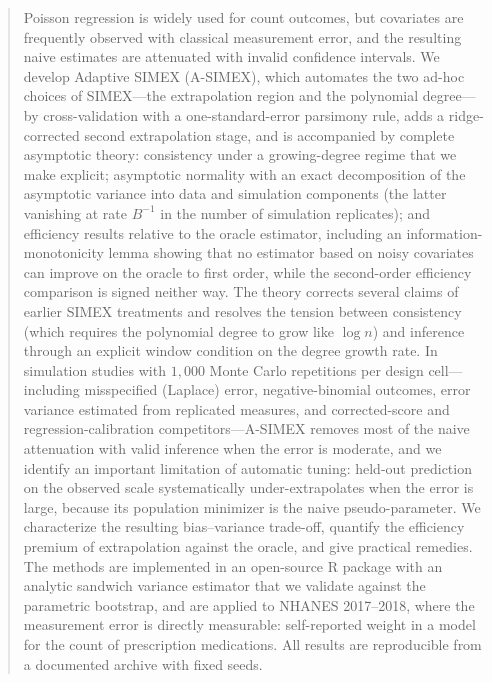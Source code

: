 \begin{abstract}
Poisson regression is widely used for count outcomes, but covariates are
frequently observed with classical measurement error, and the resulting
naive estimates are attenuated with invalid confidence intervals. We
develop Adaptive SIMEX (A-SIMEX), which automates the two ad-hoc choices
of SIMEX---the extrapolation region and the polynomial degree---by
cross-validation with a one-standard-error parsimony rule, adds a
ridge-corrected second extrapolation stage, and is accompanied by
complete asymptotic theory: consistency under a growing-degree regime
that we make explicit; asymptotic normality with an exact decomposition
of the asymptotic variance into data and simulation components (the
latter vanishing at rate $B^{-1}$ in the number of simulation
replicates); and efficiency results relative to the oracle estimator,
including an information-monotonicity lemma showing that no estimator
based on noisy covariates can improve on the oracle to first order,
while the second-order efficiency comparison is signed neither way. The
theory corrects several claims of earlier SIMEX treatments and resolves
the tension between consistency (which requires the polynomial degree to
grow like $\log n$) and inference through an explicit window condition
on the degree growth rate. In simulation studies with $1{,}000$ Monte
Carlo repetitions per design cell---including misspecified (Laplace)
error, negative-binomial outcomes, error variance estimated from
replicated measures, and corrected-score and regression-calibration
competitors---A-SIMEX removes most of the naive attenuation with valid
inference when the error is moderate, and we identify an important
limitation of automatic tuning: held-out prediction on the observed
scale systematically under-extrapolates when the error is large,
because its population minimizer is the naive pseudo-parameter. We
characterize the resulting bias--variance trade-off, quantify the
efficiency premium of extrapolation against the oracle, and give
practical remedies. The methods are implemented in an open-source R
package with an analytic sandwich variance estimator that we validate
against the parametric bootstrap, and are applied to NHANES 2017--2018,
where the measurement error is directly measurable: self-reported
weight in a model for the count of prescription medications. All
results are reproducible from a documented archive with fixed seeds.
\end{abstract}

